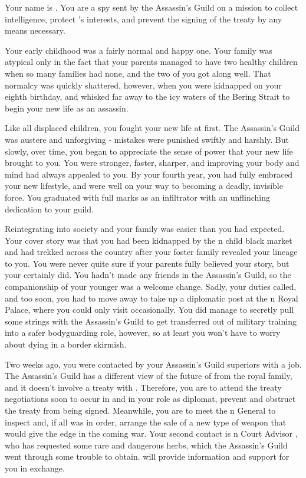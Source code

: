 \documentclass[char]{NeptuneBall}
\begin{document}
\name{\cSpy{}}

Your name is \cSpy{}. You are a spy sent by the Assassin's Guild on a mission to collect intelligence, protect \pPacifica{}'s interests, and prevent the signing of the treaty by any means necessary.

Your early childhood was a fairly normal and happy one. Your family was atypical only in the fact that your parents managed to have two healthy children when so many families had none, and the two of you got along well. That normalcy was quickly shattered, however, when you were kidnapped on your eighth birthday, and whisked far away to the icy waters of the Bering Strait to begin your new life as an assassin.

Like all displaced children, you fought your new life at first. The Assassin's Guild was austere and unforgiving - mistakes were punished swiftly and harshly. But slowly, over time, you began to appreciate the sense of power that your new life brought to you. You were stronger, faster, sharper, and improving your body and mind had always appealed to you. By your fourth year, you had fully embraced your new lifestyle, and were well on your way to becoming a deadly, invisible force. You graduated with full marks as an infiltrator with an unflinching dedication to your guild.

Reintegrating into society and your family was easier than you had expected. Your cover story was that you had been kidnapped by the \pPacifica{}n child black market and had trekked across the country after your foster family revealed your lineage to you. You were never quite sure if your parents fully believed your story, but your \cBodyguard{\sibling} \cBodyguard{} certainly did. You hadn't made any friends in the Assassin's Guild, so the companionship of your younger \cBodyguard{\sibling} was a welcome change. Sadly, your duties called, and too soon, you had to move away to take up a diplomatic post at the \pPacifica{}n Royal Palace, where you could only visit \cBodyguard{\them} occasionally. You did manage to secretly pull some strings with the Assassin's Guild to get \cBodyguard{\them} transferred out of military training into a safer bodyguarding role, however, so at least you won't have to worry about \cBodyguard{\them} dying in a border skirmish.

Two weeks ago, you were contacted by your Assassin's Guild superiors with a job. The Assassin's Guild has a different view of the future of \pPacifica{} from the royal family, and it doesn't involve a treaty with \pAtlantis{}. Therefore, you are to attend the treaty negotiations soon to occur in \pAtlantis{} and in your role as diplomat, prevent and obstruct the treaty from being signed. Meanwhile, you are to meet the \pAtlantis{}n General \cGeneral{} to inspect and, if all was in order, arrange the sale of a new type of weapon that would give \pPacifica{} the edge in the coming war. Your second contact is \pAtlantis{}n Court Advisor \cManta{}, who has requested some rare and dangerous herbs, which the Assassin's Guild went through some trouble to obtain. \cManta{\them} will provide information and support for you in exchange. 
\end{document}
